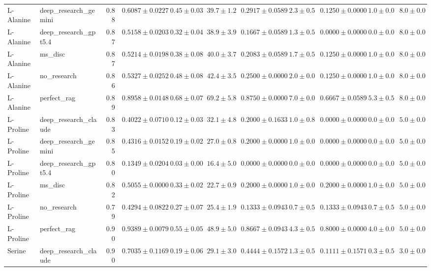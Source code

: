 \begin{table}[htbp]
\begin{tabular}{llrrrrrrrrr}
L-Alanine & deep_research_gemini & 0.88 & $0.6087 \pm 0.0227$ & $0.45 \pm 0.03$ & $39.7 \pm 1.2$ & $0.2917 \pm 0.0589$ & $2.3 \pm 0.5$ & $0.1250 \pm 0.0000$ & $1.0 \pm 0.0$ & $8.0 \pm 0.0$ \\
L-Alanine & deep_research_gpt5.4 & 0.87 & $0.5158 \pm 0.0203$ & $0.32 \pm 0.04$ & $38.9 \pm 3.9$ & $0.1667 \pm 0.0589$ & $1.3 \pm 0.5$ & $0.0000 \pm 0.0000$ & $0.0 \pm 0.0$ & $8.0 \pm 0.0$ \\
L-Alanine & ms_disc & 0.87 & $0.5214 \pm 0.0198$ & $0.38 \pm 0.08$ & $40.0 \pm 3.7$ & $0.2083 \pm 0.0589$ & $1.7 \pm 0.5$ & $0.1250 \pm 0.0000$ & $1.0 \pm 0.0$ & $8.0 \pm 0.0$ \\
L-Alanine & no_research & 0.86 & $0.5327 \pm 0.0252$ & $0.48 \pm 0.08$ & $42.4 \pm 3.5$ & $0.2500 \pm 0.0000$ & $2.0 \pm 0.0$ & $0.1250 \pm 0.0000$ & $1.0 \pm 0.0$ & $8.0 \pm 0.0$ \\
L-Alanine & perfect_rag & 0.89 & \cellcolor{green!25}$0.8958 \pm 0.0148$ & $0.68 \pm 0.07$ & $69.2 \pm 5.8$ & $0.8750 \pm 0.0000$ & $7.0 \pm 0.0$ & $0.6667 \pm 0.0589$ & $5.3 \pm 0.5$ & $8.0 \pm 0.0$ \\
\midrule
L-Proline & deep_research_claude & 0.83 & $0.4022 \pm 0.0710$ & $0.12 \pm 0.03$ & $32.1 \pm 4.8$ & $0.2000 \pm 0.1633$ & $1.0 \pm 0.8$ & $0.0000 \pm 0.0000$ & $0.0 \pm 0.0$ & $5.0 \pm 0.0$ \\
L-Proline & deep_research_gemini & 0.85 & $0.4316 \pm 0.0152$ & $0.19 \pm 0.02$ & $27.0 \pm 0.8$ & $0.2000 \pm 0.0000$ & $1.0 \pm 0.0$ & $0.0000 \pm 0.0000$ & $0.0 \pm 0.0$ & $5.0 \pm 0.0$ \\
L-Proline & deep_research_gpt5.4 & 0.80 & \cellcolor{red!25}$0.1349 \pm 0.0204$ & $0.03 \pm 0.00$ & $16.4 \pm 5.0$ & $0.0000 \pm 0.0000$ & $0.0 \pm 0.0$ & $0.0000 \pm 0.0000$ & $0.0 \pm 0.0$ & $5.0 \pm 0.0$ \\
L-Proline & ms_disc & 0.82 & $0.5055 \pm 0.0000$ & $0.33 \pm 0.02$ & $22.7 \pm 0.9$ & $0.2000 \pm 0.0000$ & $1.0 \pm 0.0$ & $0.2000 \pm 0.0000$ & $1.0 \pm 0.0$ & $5.0 \pm 0.0$ \\
L-Proline & no_research & 0.79 & $0.4294 \pm 0.0822$ & $0.27 \pm 0.07$ & $25.4 \pm 1.9$ & $0.1333 \pm 0.0943$ & $0.7 \pm 0.5$ & $0.1333 \pm 0.0943$ & $0.7 \pm 0.5$ & $5.0 \pm 0.0$ \\
L-Proline & perfect_rag & 0.90 & \cellcolor{green!25}$0.9389 \pm 0.0079$ & $0.55 \pm 0.05$ & $48.9 \pm 5.0$ & $0.8667 \pm 0.0943$ & $4.3 \pm 0.5$ & $0.8000 \pm 0.0000$ & $4.0 \pm 0.0$ & $5.0 \pm 0.0$ \\
\midrule
Serine & deep_research_claude & 0.90 & \cellcolor{red!25}$0.7035 \pm 0.1169$ & $0.19 \pm 0.06$ & $29.1 \pm 3.0$ & $0.4444 \pm 0.1572$ & $1.3 \pm 0.5$ & $0.1111 \pm 0.1571$ & $0.3 \pm 0.5$ & $3.0 \pm 0.0$ \\

\end{tabular}
\end{table}

